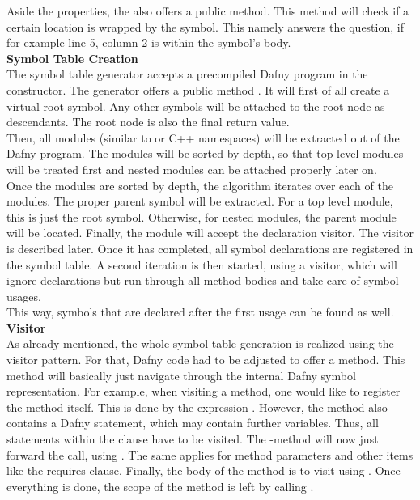Aside the properties, the  also offers a public method.
This method will check if a certain location is wrapped by the symbol.
This namely answers the question, if for example line 5, column 2 is within the symbol's body.\\

\textbf{Symbol Table Creation}\\
The symbol table generator accepts a precompiled Dafny program in the constructor.
The generator offers a public method .
It will first of all create a virtual root symbol.
Any other symbols will be attached to the root node as descendants.
The root node is also the final return value.\\

Then, all modules (similar to \CsharpWithSpace or C++ namespaces) will be extracted out of the Dafny program.
The modules will be sorted by depth, so that top level modules will be treated first and nested modules can be attached properly later on.\\

Once the modules are sorted by depth, the algorithm iterates over each of the modules.
The proper parent symbol will be extracted.
For a top level module, this is just the root symbol.
Otherwise, for nested modules, the parent module will be located.
Finally, the module will accept the declaration visitor.
The visitor is described later.
Once it has completed, all symbol declarations are registered in the symbol table.
A second iteration is then started, using a visitor, which will ignore declarations but run through all method bodies and take care of symbol usages.\\
This way, symbols that are declared after the first usage can be found as well.\\

\textbf{Visitor}\\
As already mentioned, the whole symbol table generation is realized using the visitor pattern.
For that, Dafny code had to be adjusted to offer a  method.
This method will basically just navigate through the internal Dafny symbol representation.
For example, when visiting a method, one would like to register the method itself.
This is done by the expression .
However, the method also contains a Dafny  statement, which may contain further variables.
Thus, all statements within the  clause have to be visited.
The -method will now just forward the call, using .
The same applies for method parameters and other items like the requires clause.
Finally, the body of the method is to visit using .
Once everything is done, the scope of the method is left by calling .\\

